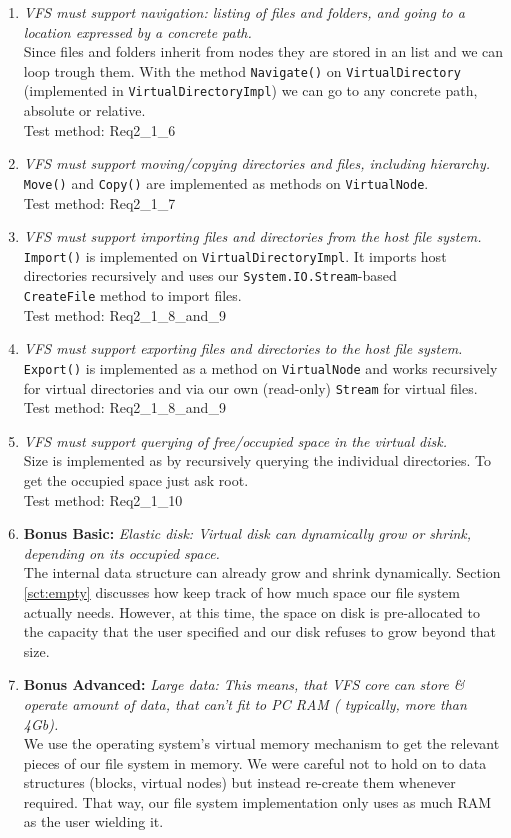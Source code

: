 \documentclass[a4paper,12pt]{article}
\begin{document}
\begin{enumerate}
	\item \emph{VFS must support navigation: listing of files and folders, and going to a location expressed by a
concrete path.}\\
		Since files and folders inherit from nodes they are stored in an list and we can loop trough them. With the method \texttt{Navigate()} on \texttt{VirtualDirectory} (implemented in \texttt{VirtualDirectoryImpl}) we can go to any concrete path, absolute or relative.\\
		Test method: Req2\_1\_6
	\item \emph{VFS must support moving/copying directories and files, including hierarchy.}\\
		\texttt{Move()} and \texttt{Copy()} are implemented as methods on \texttt{VirtualNode}.\\
		Test method: Req2\_1\_7
	\item \emph{VFS must support importing files and directories from the host file system.}\\
		\texttt{Import()} is implemented on \texttt{VirtualDirectoryImpl}. It imports host directories recursively and uses our \texttt{System.IO.Stream}-based\\\texttt{CreateFile} method to import files.\\
		Test method: Req2\_1\_8\_and\_9
	\item \emph{VFS must support exporting files and directories to the host file system.}\\
		\texttt{Export()} is implemented as a method on \texttt{VirtualNode} and works recursively for virtual directories and via our own (read-only) \texttt{Stream} for virtual files.\\
		Test method: Req2\_1\_8\_and\_9
	\item \emph{VFS must support querying of free/occupied space in the virtual disk.}\\
		Size is implemented as by recursively querying the individual directories. To get the occupied space just ask root.\\
		Test method: Req2\_1\_10
	\item \textbf{Bonus Basic:} \emph{Elastic disk: Virtual disk can dynamically grow or shrink, depending on its occupied space.}\\
		The internal data structure can already grow and shrink dynamically. 
Section \ref{sct:empty} discusses how keep track of how much space our file system actually needs.
However, at this time, the space on disk is pre-allocated to the capacity that the user specified and our disk refuses to grow beyond that size.
	\item \textbf{Bonus Advanced:} \emph{Large data: This means, that VFS core can store \& operate amount of data, that can't fit to PC RAM ( typically, more than 4Gb).}\\
		We use the operating system's virtual memory mechanism to get the relevant pieces of our file system in memory. 
We were careful not to hold on to data structures (blocks, virtual nodes) but instead re-create them whenever required.
That way, our file system implementation only uses as much RAM as the user wielding it.


\end{enumerate}
\end{document}
